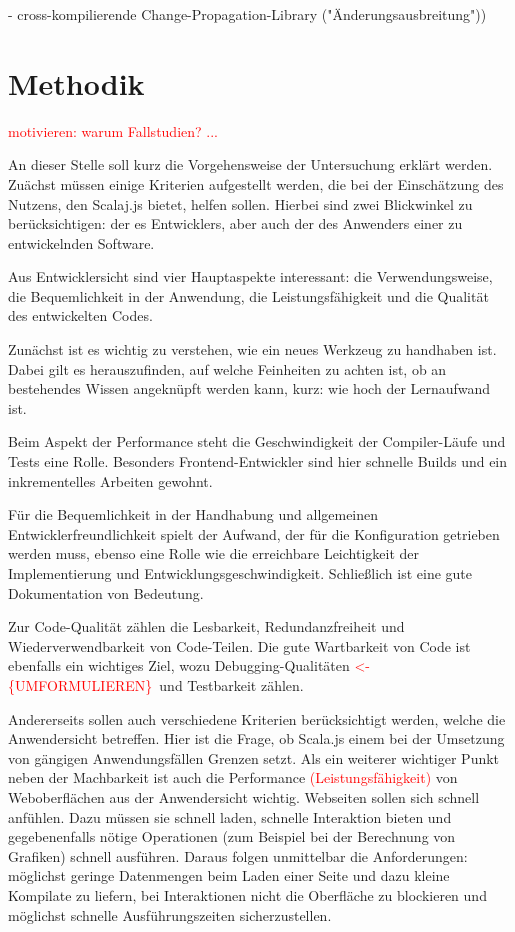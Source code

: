 \documentclass[a4paper, 12pt, hidelinks, listof=totoc, listoftables=totoc, bibliography=totoc]{scrreprt}
\newcommand{\TODO}[1]{\textcolor{red}{#1}\newline}
\newcommand{\REDOi}{\textcolor{red}{<- \{UMFORMULIEREN\}~}}
\begin{document}
- cross-kompilierende Change-Propagation-Library ("Änderungsausbreitung"))






\chapter{Methodik}\label{chap:methods}

\TODO{motivieren: warum Fallstudien? ...}

An dieser Stelle soll kurz die Vorgehensweise der Untersuchung erklärt werden. Zuächst müssen einige Kriterien aufgestellt werden, die bei der Einschätzung des Nutzens, den Scalaj.js bietet, helfen sollen. Hierbei sind zwei Blickwinkel zu berücksichtigen: der es Entwicklers, aber auch der des Anwenders einer zu entwickelnden Software.

Aus Entwicklersicht sind vier Hauptaspekte interessant: die Verwendungsweise, die Bequemlichkeit in der Anwendung, die Leistungsfähigkeit und die Qualität des entwickelten Codes. 

Zunächst ist es wichtig zu verstehen, wie ein neues Werkzeug zu handhaben ist. Dabei gilt es herauszufinden, auf welche Feinheiten zu achten ist, ob an bestehendes Wissen angeknüpft werden kann, kurz: wie hoch der Lernaufwand ist. 

Beim Aspekt der Performance steht die Geschwindigkeit der Compiler-Läufe und Tests eine Rolle. Besonders Frontend-Entwickler sind hier schnelle Builds und ein inkrementelles Arbeiten gewohnt.

Für die Bequemlichkeit in der Handhabung und allgemeinen Entwicklerfreundlichkeit spielt der Aufwand, der für die Konfiguration getrieben werden muss, ebenso eine Rolle wie die erreichbare Leichtigkeit der Implementierung und Entwicklungsgeschwindigkeit. Schließlich ist eine gute Dokumentation von Bedeutung.

Zur Code-Qualität zählen die Lesbarkeit, Redundanzfreiheit und Wiederverwendbarkeit von Code-Teilen. Die gute Wartbarkeit von Code ist ebenfalls ein wichtiges Ziel, wozu Debugging-Qualitäten \REDOi und Testbarkeit zählen.

Andererseits sollen auch verschiedene Kriterien berücksichtigt werden, welche die Anwendersicht betreffen. Hier ist die Frage, ob Scala.js einem bei der Umsetzung von gängigen Anwendungsfällen Grenzen setzt. Als ein weiterer wichtiger Punkt neben der Machbarkeit ist auch die Performance \TODO{(Leistungsfähigkeit)} von Weboberflächen aus der Anwendersicht wichtig. Webseiten sollen sich schnell anfühlen. Dazu müssen sie schnell laden, schnelle Interaktion bieten und gegebenenfalls nötige Operationen (zum Beispiel bei der Berechnung von Grafiken) schnell ausführen. Daraus folgen unmittelbar die Anforderungen: möglichst geringe Datenmengen beim Laden einer Seite und dazu kleine Kompilate zu liefern, bei Interaktionen nicht die Oberfläche zu blockieren und möglichst schnelle Ausführungszeiten sicherzustellen.
\end{document}

